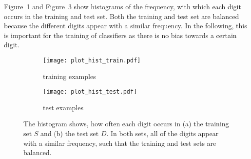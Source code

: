 Figure~\ref{fig:plot_hist_train} and Figure~\ref{fig:plot_hist_test} show histograms of the frequency, with which each digit occurs in the training and test set. Both the training and test set are balanced because the different digits appear with a similar frequency. In the following, this is important for the training of classifiers as there is no bias towards a certain digit. 

\begin{figure}[h!]
    \begin{subfigure}[t]{0.5\textwidth}
        \centering
        \texttt{[image: plot\_hist\_train.pdf]} 
        \caption{training examples} \label{fig:plot_hist_train}
    \end{subfigure}
    \hfill
    \begin{subfigure}[t]{0.5\textwidth}
        \centering
        \texttt{[image: plot\_hist\_test.pdf]} 
        \caption{test examples} \label{fig:plot_hist_test}
    \end{subfigure}
    \caption{The histogram shows, how often each digit occurs in (a) the training set $S$ and (b) the test set $D$. In both sets, all of the digits appear with a similar frequency, such that the training and test sets are balanced.}
\end{figure}


